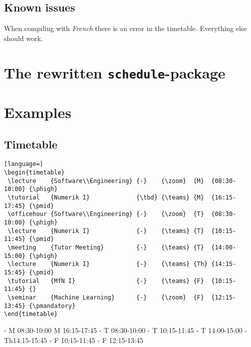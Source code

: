 \documentclass[english]{article}
\begin{document}
	\subsection{Known issues}
	When compiling with \emph{French} there is an error in the timetable. Everything else should work.
	
	\pagebreak
	\section{The rewritten \texttt{schedule}-package}
	
	
	
	
	\pagebreak
	\section{Examples}
	\subsection{Timetable}
	\begin{lstlisting}[language=]
\begin{timetable}			
 \lecture    {Software\\Engineering} {-}    {\zoom}  {M}  {08:30-10:00} {\phigh}		
 \tutorial   {Numerik I}             {\tbd} {\teams} {M}  {16:15-17:45} {\pmid}
 \officehour {Software\\Engineering} {-}    {\zoom}  {T}  {08:30-10:00} {\phigh}	
 \lecture    {Numerik I}             {-}    {\teams} {T}  {10:15-11:45} {\pmid}	
 \meeting    {Tutor Meeting}         {-}    {\teams} {T}  {14:00-15:00} {\phigh}	
 \lecture    {Numerik I}             {-}    {\teams} {Th} {14:15-15:45} {\pmid}	
 \tutorial   {MfN I}                 {-}    {\teams} {F}  {10:15-11:45} {}
 \seminar    {Machine Learning}      {-}    {\zoom}  {F}  {12:15-13:45} {\pmandatory}	
\end{timetable}		
	\end{lstlisting}	
	\begin{timetable}			
						{-}		{\teams}			{M}	{08:30-10:00}	{\phigh}		
									{\tbd}	{\teams}			{M}	{16:15-17:45}	{\pmid}
						{-}		{\teams}			{T}	{08:30-10:00}	{\phigh}	
									{-}		{\teams}			{T}	{10:15-11:45}	{\pmid}	
								{-}		{\teams}			{T}	{14:00-15:00}	{\phigh}	
									{-}		{\teams}			{Th}{14:15-15:45}	{\pmid}	
										{-}		{\teams}			{F}	{10:15-11:45}	{}
							{-}		{\teams}			{F}	{12:15-13:45}	{\pmandatory}	
	\end{timetable}
	
\end{document}

